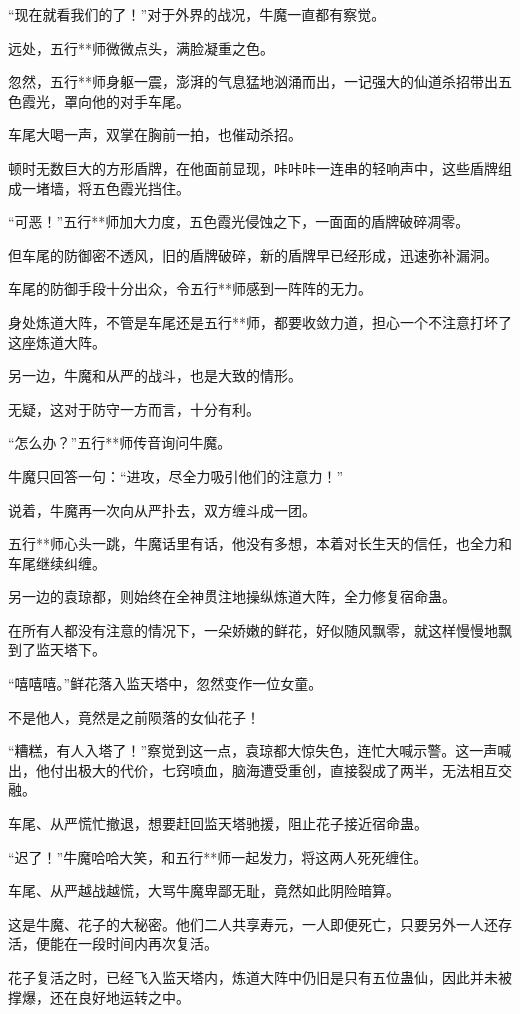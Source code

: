 \begin{this_body}
“现在就看我们的了！”对于外界的战况，牛魔一直都有察觉。

远处，五行**师微微点头，满脸凝重之色。

忽然，五行**师身躯一震，澎湃的气息猛地汹涌而出，一记强大的仙道杀招带出五色霞光，罩向他的对手车尾。

车尾大喝一声，双掌在胸前一拍，也催动杀招。

顿时无数巨大的方形盾牌，在他面前显现，咔咔咔一连串的轻响声中，这些盾牌组成一堵墙，将五色霞光挡住。

“可恶！”五行**师加大力度，五色霞光侵蚀之下，一面面的盾牌破碎凋零。

但车尾的防御密不透风，旧的盾牌破碎，新的盾牌早已经形成，迅速弥补漏洞。

车尾的防御手段十分出众，令五行**师感到一阵阵的无力。

身处炼道大阵，不管是车尾还是五行**师，都要收敛力道，担心一个不注意打坏了这座炼道大阵。

另一边，牛魔和从严的战斗，也是大致的情形。

无疑，这对于防守一方而言，十分有利。

“怎么办？”五行**师传音询问牛魔。

牛魔只回答一句：“进攻，尽全力吸引他们的注意力！”

说着，牛魔再一次向从严扑去，双方缠斗成一团。

五行**师心头一跳，牛魔话里有话，他没有多想，本着对长生天的信任，也全力和车尾继续纠缠。

另一边的袁琼都，则始终在全神贯注地操纵炼道大阵，全力修复宿命蛊。

在所有人都没有注意的情况下，一朵娇嫩的鲜花，好似随风飘零，就这样慢慢地飘到了监天塔下。

“嘻嘻嘻。”鲜花落入监天塔中，忽然变作一位女童。

不是他人，竟然是之前陨落的女仙花子！

“糟糕，有人入塔了！”察觉到这一点，袁琼都大惊失色，连忙大喊示警。这一声喊出，他付出极大的代价，七窍喷血，脑海遭受重创，直接裂成了两半，无法相互交融。

车尾、从严慌忙撤退，想要赶回监天塔驰援，阻止花子接近宿命蛊。

“迟了！”牛魔哈哈大笑，和五行**师一起发力，将这两人死死缠住。

车尾、从严越战越慌，大骂牛魔卑鄙无耻，竟然如此阴险暗算。

这是牛魔、花子的大秘密。他们二人共享寿元，一人即便死亡，只要另外一人还存活，便能在一段时间内再次复活。

花子复活之时，已经飞入监天塔内，炼道大阵中仍旧是只有五位蛊仙，因此并未被撑爆，还在良好地运转之中。


\end{this_body}
